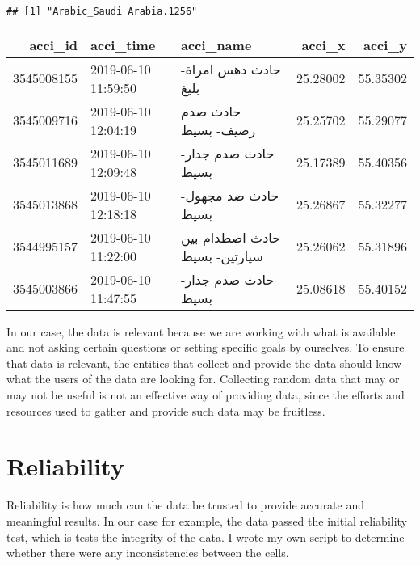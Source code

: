 \documentclass[
]{book}
\begin{document}
\begin{verbatim}
## [1] "Arabic_Saudi Arabia.1256"
\end{verbatim}

\begin{tabular}{r|l|l|r|r}
\hline
acci\_id & acci\_time & acci\_name & acci\_x & acci\_y\\
\hline
3545008155 & 2019-06-10 11:59:50 & حادث دهس امراة- بليغ & 25.28002 & 55.35302\\
\hline
3545009716 & 2019-06-10 12:04:19 & حادث صدم رصيف- بسيط & 25.25702 & 55.29077\\
\hline
3545011689 & 2019-06-10 12:09:48 & حادث صدم جدار- بسيط & 25.17389 & 55.40356\\
\hline
3545013868 & 2019-06-10 12:18:18 & حادث ضد مجهول- بسيط & 25.26867 & 55.32277\\
\hline
3544995157 & 2019-06-10 11:22:00 & حادث اصطدام بين سيارتين- بسيط & 25.26062 & 55.31896\\
\hline
3545003866 & 2019-06-10 11:47:55 & حادث صدم جدار- بسيط & 25.08618 & 55.40152\\
\hline
\end{tabular}

In our case, the data is relevant because we are working with what is available and not asking certain questions or setting specific goals by ourselves. To ensure that data is relevant, the entities that collect and provide the data should know what the users of the data are looking for. Collecting random data that may or may not be useful is not an effective way of providing data, since the efforts and resources used to gather and provide such data may be fruitless.

\hypertarget{reliability}{%
\section{Reliability}\label{reliability}}

Reliability is how much can the data be trusted to provide accurate and meaningful results. In our case for example, the data passed the initial reliability test, which is tests the integrity of the data. I wrote my own script to determine whether there were any inconsistencies between the cells.
\end{document}
